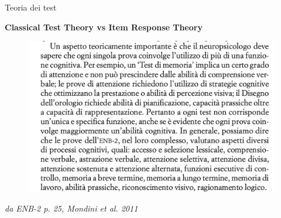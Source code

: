\documentclass[
  ignorenonframetext,
]{beamer}
\begin{document}
\begin{frame}{Teoria dei test}
\label{teoria-dei-test-11}
\begin{center}
  \textbf{Classical Test Theory vs Item Response Theory}
\end{center}
\vspace{1.5em}

\begin{figure}
  \includegraphics[scale=0.5]{Figures/ENB2_cit.png}
\end{figure}

\footnotesize
\begin{flushright}
  \textit{da ENB-2 p. 25, Mondini et al. 2011}
\end{flushright}
\end{frame}
\end{document}
